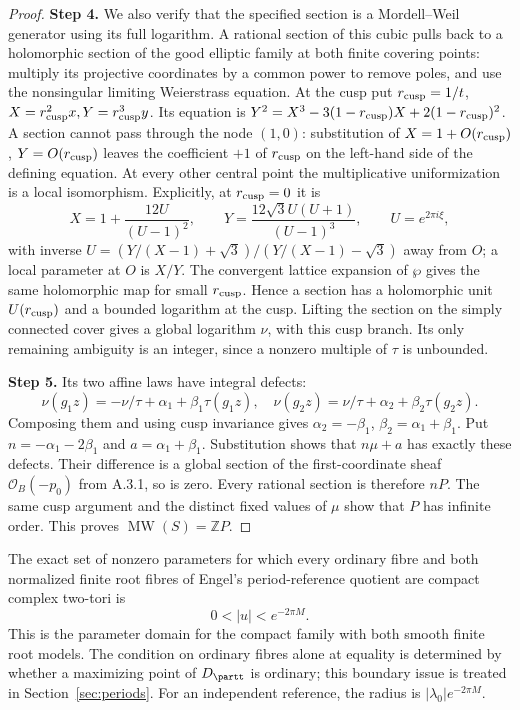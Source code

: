 \begin{proof}
\par\smallskip\noindent\textbf{Step 4.} We also verify that the specified section is a Mordell--Weil generator using its full logarithm. A rational section of this cubic pulls back to a holomorphic section of the good elliptic family at both finite covering points: multiply its projective coordinates by a common power to remove poles, and use the nonsingular limiting Weierstrass equation. At the cusp put $r_{\rm cusp}=1/t$, $X=r_{\rm cusp}^2x,Y=r_{\rm cusp}^3y$. Its equation is $Y^2=X^3-3(1-r_{\rm cusp})X+2(1-r_{\rm cusp})^2$. A section cannot pass through the node $(1,0)$: substitution of $X=1+O(r_{\rm cusp})$, $Y=O(r_{\rm cusp})$ leaves the coefficient $+1$ of $r_{\rm cusp}$ on the left-hand side of the defining equation. At every other central point the multiplicative uniformization is a local isomorphism. Explicitly, at $r_{\rm cusp}=0$ it is
\[
 X=1+\frac{12U}{(U-1)^2},\qquad
 Y=\frac{12\sqrt3 U(U+1)}{(U-1)^3},\qquad U=e^{2\pi i\xi},
\]
with inverse $U=(Y/(X-1)+\sqrt3)/(Y/(X-1)-\sqrt3)$ away from $O$; a local parameter at $O$ is $X/Y$. The convergent lattice expansion of $\wp$ gives the same holomorphic map for small $r_{\rm cusp}$. Hence a section has a holomorphic unit $U(r_{\rm cusp})$ and a bounded logarithm at the cusp. Lifting the section on the simply connected cover gives a global logarithm $\nu$, with this cusp branch. Its only remaining ambiguity is an integer, since a nonzero multiple of $\tau$ is unbounded.

\par\smallskip\noindent\textbf{Step 5.} Its two affine laws have integral defects:
\[
 \nu(g_1z)=-\nu/\tau+\alpha_1+\beta_1\tau(g_1z),\quad
 \nu(g_2z)=\nu/\tau+\alpha_2+\beta_2\tau(g_2z).
\]
Composing them and using cusp invariance gives $\alpha_2=-\beta_1$, $\beta_2=\alpha_1+\beta_1$. Put $n=-\alpha_1-2\beta_1$ and $a=\alpha_1+\beta_1$. Substitution shows that $n\mu+a$ has exactly these defects. Their difference is a global section of the first-coordinate sheaf $\mathcal O_B(-p_0)$ from A.3.1, so is zero. Every rational section is therefore $nP$. The same cusp argument and the distinct fixed values of $\mu$ show that $P$ has infinite order. This proves $\operatorname{MW}(S)=\mathbb ZP$.
\end{proof}
\begin{proposition}[FAM B.1.2; T]\label{fam:B.1.2}
The exact set of nonzero parameters for which every ordinary fibre and both normalized finite root fibres of Engel's period-reference quotient are compact complex two-tori is
\[
 0<|u|<e^{-2\pi M}.
\]
This is the parameter domain for the compact family with both smooth finite root models. The condition on ordinary fibres alone at equality is determined by whether a maximizing point of $D_{\partt}$ is ordinary; this boundary issue is treated in Section~\ref{sec:periods}. For an independent reference, the radius is $|\lambda_0|e^{-2\pi M}$.
\end{proposition}
